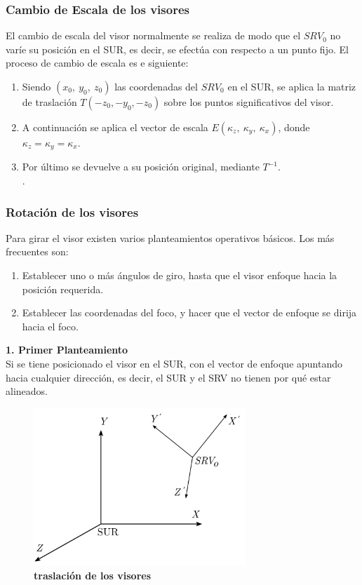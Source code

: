 \subsubsection{Cambio de Escala de los visores}
El cambio de escala del visor normalmente se realiza de modo que el $SRV_0$ no varíe su posición en el SUR, es decir, se efectúa con respecto a un punto fijo. El proceso de cambio de escala es e siguiente:
\begin{enumerate}
    \item Siendo $(x_0, \ y_0, \ z_0)$ las coordenadas del $SRV_0$ en el SUR, se aplica la matriz de traslación $T(-z_0, -y_0, -z_0)$ sobre los puntos significativos del visor.
    \item A continuación se aplica el vector de escala $E(\kappa_z, \ \kappa_y, \ \kappa_x)$, donde $\kappa_z = \kappa_y = \kappa_x$.
    \item Por último se devuelve a su posición original, mediante $T^{-1}$. \\
     \citep{Ramos2011}.
\end{enumerate}

\subsubsection{Rotación de los visores}
Para girar el visor existen varios planteamientos operativos básicos. Los más frecuentes son:
\begin{enumerate}
\item Establecer uno o más ángulos de giro, hasta que el visor enfoque hacia la posición requerida.
\item Establecer las coordenadas del foco, y hacer que el vector de enfoque se dirija hacia el foco.
\end{enumerate}

\textbf{1. Primer Planteamiento}\\
Si se tiene posicionado el visor en el SUR, con el vector de enfoque apuntando hacia cualquier dirección, es decir, el SUR y el SRV no tienen por qué estar alineados.

\begin{figure}[h]
\includegraphics[width=8cm]{Img/GEO/geo-visor-5.png}
\centering
    \caption{\footnotesize{\textbf{traslación de los visores}}}
    \label{geo-visor5}
\end{figure}

